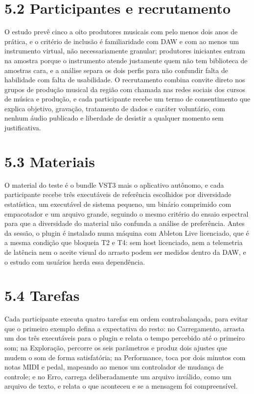 \documentclass[11pt,a4paper]{article}
\begin{document}
\section*{5.2 Participantes e recrutamento}

O estudo prevê cinco a oito produtores musicais com pelo menos dois anos de prática, e o critério de inclusão é familiaridade com DAW e com ao menos um instrumento virtual, não necessariamente granular; produtores iniciantes entram na amostra porque o instrumento atende justamente quem não tem biblioteca de amostras cara, e a análise separa os dois perfis para não confundir falta de habilidade com falta de usabilidade. O recrutamento combina convite direto nos grupos de produção musical da região com chamada nas redes sociais dos cursos de música e produção, e cada participante recebe um termo de consentimento que explica objetivo, gravação, tratamento de dados e caráter voluntário, com nenhum áudio publicado e liberdade de desistir a qualquer momento sem justificativa.


\section*{5.3 Materiais}

O material do teste é o bundle VST3 mais o aplicativo autônomo, e cada participante recebe três executáveis de referência escolhidos por diversidade estatística, um executável de sistema pequeno, um binário comprimido com empacotador e um arquivo grande, seguindo o mesmo critério do ensaio espectral para que a diversidade do material não confunda a análise de preferência. Antes da sessão, o plugin é instalado numa máquina com Ableton Live licenciado, que é a mesma condição que bloqueia T2 e T4: sem host licenciado, nem a telemetria de latência nem o aceite visual do arrasto podem ser medidos dentro da DAW, e o estudo com usuários herda essa dependência.


\section*{5.4 Tarefas}

Cada participante executa quatro tarefas em ordem contrabalançada, para evitar que o primeiro exemplo defina a expectativa do resto: no Carregamento, arrasta um dos três executáveis para o plugin e relata o tempo percebido até o primeiro som; na Exploração, percorre os seis parâmetros e produz dois ajustes que mudem o som de forma satisfatória; na Performance, toca por dois minutos com notas MIDI e pedal, mapeando ao menos um controlador de mudança de controle; e no Erro, carrega deliberadamente um arquivo inválido, como um arquivo de texto, e relata o que aconteceu e se a mensagem foi compreensível.
\end{document}

